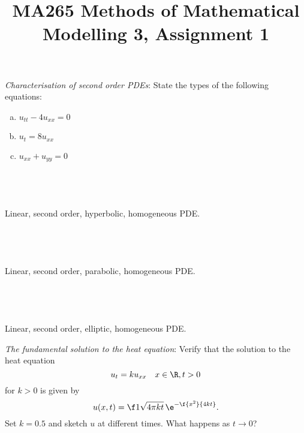 \documentclass[a4paper]{article}
\title{MA265 Methods of Mathematical Modelling 3, Assignment 1}
\begin{document}
\maketitle

\setlength{\parindent}{0em}
\setlength{\parskip}{1em}


\begin{questionbody}
\textit{Characterisation of second order PDEs}: State the types of the following equations:
\begin{enumerate}[(a)]
\item $u_{tt} - 4 u_{xx} = 0$
\item $u_t = 8 u_{xx}$
\item $u_{xx} + u_{yy} = 0$
\end{enumerate}
\end{questionbody}

\subsection{~} %

Linear, second order, hyperbolic, homogeneous PDE.

\subsection{~} %

Linear, second order, parabolic, homogeneous PDE.

\subsection{~} %

Linear, second order, elliptic, homogeneous PDE.



\begin{questionbody}
\textit{The fundamental solution to the heat equation}: Verify that the solution to the heat equation \begin{equation}
u_t = k u_{xx} \quad x \in \R, t > 0
\label{eqn:heat-equation}
\end{equation}
for $k > 0$ is given by \[
u(x, t) = \f1{\sqrt{4 \pi kt}} \, \e^{-\f{x^2}{4 kt}}.
\] Set $k = 0.5$ and sketch $u$ at different times. What happens as $t \to 0$?
\end{questionbody}
\end{document}
